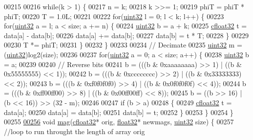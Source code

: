 \begin{DoxyCode}
00215 
00216         \textcolor{keywordflow}{while}(k > 1) \{
00217             n = k;
00218             k >>= 1;
00219             phiT = phiT * phiT;
00220             T = 1.0L;
00221 
00222             \textcolor{keywordflow}{for}(\hyperlink{definitions_8hpp_a1134b580f8da4de94ca6b1de4d37975e}{uint32} l = 0; l < k; l++) \{
00223                 \textcolor{keywordflow}{for}(\hyperlink{definitions_8hpp_a1134b580f8da4de94ca6b1de4d37975e}{uint32} a = l; a < size; a += n) \{
00224                     \hyperlink{definitions_8hpp_a1134b580f8da4de94ca6b1de4d37975e}{uint32} b = a + k;
00225                     \hyperlink{definitions_8hpp_a960be6b6614c08090c16574dba10a421}{cfloat32} t = data[a] - data[b];
00226                     data[a] += data[b];
00227                     data[b] = t * T;
00228                 \}
00229 
00230                 T *= phiT;
00231             \}
00232         \}
00233 
00234         \textcolor{comment}{// Decimate}
00235         \hyperlink{definitions_8hpp_a1134b580f8da4de94ca6b1de4d37975e}{uint32} m = (\hyperlink{definitions_8hpp_a1134b580f8da4de94ca6b1de4d37975e}{uint32})log2(size);
00236 
00237         \textcolor{keywordflow}{for}(\hyperlink{definitions_8hpp_a1134b580f8da4de94ca6b1de4d37975e}{uint32} a = 0; a < size; a++) \{
00238             \hyperlink{definitions_8hpp_a1134b580f8da4de94ca6b1de4d37975e}{uint32} b = a;
00239 
00240             \textcolor{comment}{// Reverse bits}
00241             b = (((b & 0xaaaaaaaa) >> 1) | ((b & 0x55555555) << 1));
00242             b = (((b & 0xcccccccc) >> 2) | ((b & 0x33333333) << 2));
00243             b = (((b & 0xf0f0f0f0) >> 4) | ((b & 0x0f0f0f0f) << 4));
00244             b = (((b & 0xff00ff00) >> 8) | ((b & 0x00ff00ff) << 8));
00245             b = ((b >> 16) | (b << 16)) >> (32 - m);
00246 
00247             \textcolor{keywordflow}{if} (b > a)
00248             \{
00249                 \hyperlink{definitions_8hpp_a960be6b6614c08090c16574dba10a421}{cfloat32} t = data[a];
00250                 data[a] = data[b];
00251                 data[b] = t;
00252             \}
00253         \}
00254     \}
00255 
\hypertarget{sigmath_8hpp_source_l00256}{}\hyperlink{namespacevaso_a5d355b5c326a852e2ce95c258450898c}{00256}     \textcolor{keywordtype}{void} \hyperlink{namespacevaso_a5d355b5c326a852e2ce95c258450898c}{mag}(\hyperlink{definitions_8hpp_a960be6b6614c08090c16574dba10a421}{cfloat32}* orig, \hyperlink{definitions_8hpp_aacdc525d6f7bddb3ae95d5c311bd06a1}{float32}* newmags, \hyperlink{definitions_8hpp_a1134b580f8da4de94ca6b1de4d37975e}{uint32} size) \{
00257         \textcolor{comment}{//loop to run throught the length of array orig}

\end{DoxyCode}
